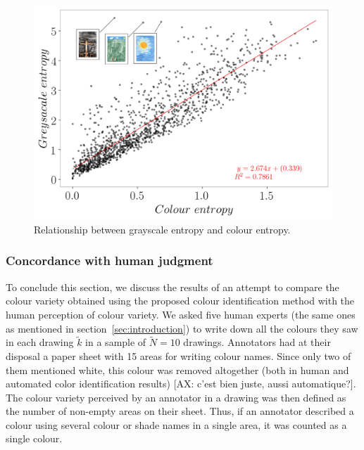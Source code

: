 \documentclass[11pt,a4paper]{article}
\begin{document}

\begin{figure}[h!]
	\centering
	\includegraphics[width=\linewidth]{figures/colors-greysacale-entropies.png}
	\caption{Relationship between grayscale entropy and colour entropy.}
	\label{fig:entropies}
\end{figure}

\subsubsection{Concordance with human judgment} \label{sec:results_variety_concordance}

To conclude this section, we discuss the results of an attempt to compare the colour variety obtained using the proposed colour identification method with the human perception of colour variety. We asked five human experts (the same ones as mentioned in section~\ref{sec:introduction}) to write down all the colours they saw in each drawing $\tilde{k}$ in a sample of $\tilde{N} = 10$ drawings. Annotators had at their disposal a paper sheet with 15 areas for writing colour names. Since only two of them mentioned white, this colour was removed altogether (both in human and automated color identification results) {\color{green}[AX: c'est bien juste, aussi automatique?]}. The colour variety perceived by an annotator in a drawing was then defined as the number of non-empty areas on their sheet. Thus, if an annotator described a colour using several colour or shade names in a single area, it was counted as a single colour.
\end{document}
